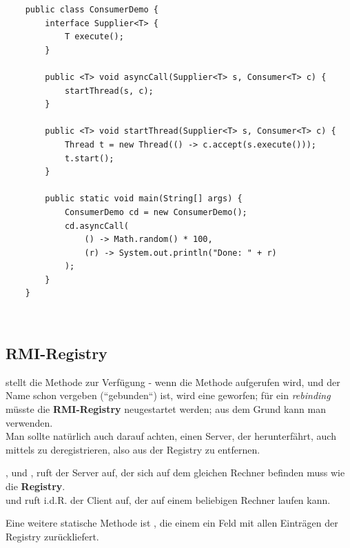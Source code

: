 \begin{verbatim}
    public class ConsumerDemo {
        interface Supplier<T> {
            T execute();
        }

        public <T> void asyncCall(Supplier<T> s, Consumer<T> c) {
            startThread(s, c);
        }

        public <T> void startThread(Supplier<T> s, Consumer<T> c) {
            Thread t = new Thread(() -> c.accept(s.execute()));
            t.start();
        }

        public static void main(String[] args) {
            ConsumerDemo cd = new ConsumerDemo();
            cd.asyncCall(
                () -> Math.random() * 100,
                (r) -> System.out.println("Done: " + r)
            );
        }
    }
\end{verbatim}\\

\subsection{RMI-Registry}

 stellt die Methode  zur Verfügung - wenn die Methode aufgerufen wird, und der Name schon vergeben (``gebunden``) ist, wird eine  geworfen; für ein \textit{rebinding} müsste die \textbf{RMI-Registry} neugestartet werden; aus dem Grund kann man  verwenden.\\
Man sollte natürlich auch darauf achten, einen Server, der herunterfährt, auch mittels  zu deregistrieren, also aus der Registry zu entfernen.\\

\begin{tcolorbox}
    ,  und , ruft der Server auf, der sich auf dem gleichen Rechner befinden muss wie die \textbf{Registry}.\\
    \noindent
     und  ruft i.d.R. der Client auf, der auf einem beliebigen Rechner laufen kann.
\end{tcolorbox}

\noindent
Eine weitere statische Methode ist , die einem ein Feld mit allen Einträgen der Registry zurückliefert.\\

